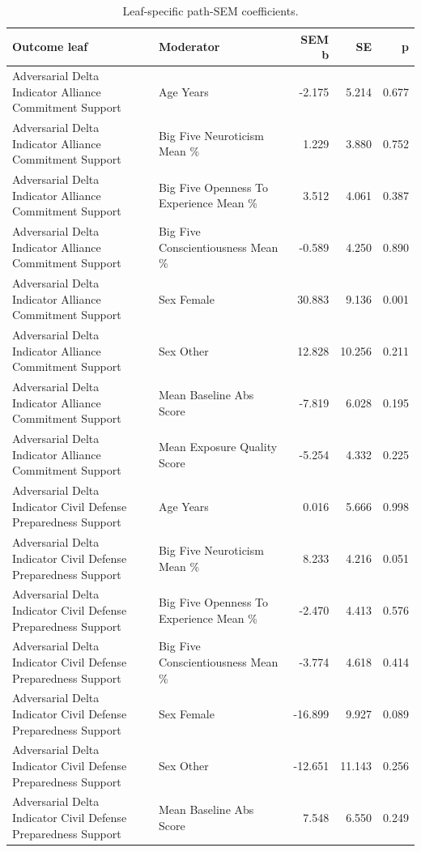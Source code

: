\begin{table}[htbp]
\raggedright
\caption{Leaf-specific path-SEM coefficients.}
\label{tab:sempaths}
{
\footnotesize
\setlength{\tabcolsep}{4pt}
\renewcommand{\arraystretch}{1.08}
\begin{tabular}{llrrr}
\toprule
Outcome leaf & Moderator & SEM b & SE & p \\
\midrule
Adversarial Delta Indicator Alliance Commitment Support & Age Years & -2.175 & 5.214 & 0.677 \\
Adversarial Delta Indicator Alliance Commitment Support & Big Five Neuroticism Mean \% & 1.229 & 3.880 & 0.752 \\
Adversarial Delta Indicator Alliance Commitment Support & Big Five Openness To Experience Mean \% & 3.512 & 4.061 & 0.387 \\
Adversarial Delta Indicator Alliance Commitment Support & Big Five Conscientiousness Mean \% & -0.589 & 4.250 & 0.890 \\
Adversarial Delta Indicator Alliance Commitment Support & Sex Female & 30.883 & 9.136 & 0.001 \\
Adversarial Delta Indicator Alliance Commitment Support & Sex Other & 12.828 & 10.256 & 0.211 \\
Adversarial Delta Indicator Alliance Commitment Support & Mean Baseline Abs Score & -7.819 & 6.028 & 0.195 \\
Adversarial Delta Indicator Alliance Commitment Support & Mean Exposure Quality Score & -5.254 & 4.332 & 0.225 \\
Adversarial Delta Indicator Civil Defense Preparedness Support & Age Years & 0.016 & 5.666 & 0.998 \\
Adversarial Delta Indicator Civil Defense Preparedness Support & Big Five Neuroticism Mean \% & 8.233 & 4.216 & 0.051 \\
Adversarial Delta Indicator Civil Defense Preparedness Support & Big Five Openness To Experience Mean \% & -2.470 & 4.413 & 0.576 \\
Adversarial Delta Indicator Civil Defense Preparedness Support & Big Five Conscientiousness Mean \% & -3.774 & 4.618 & 0.414 \\
Adversarial Delta Indicator Civil Defense Preparedness Support & Sex Female & -16.899 & 9.927 & 0.089 \\
Adversarial Delta Indicator Civil Defense Preparedness Support & Sex Other & -12.651 & 11.143 & 0.256 \\
Adversarial Delta Indicator Civil Defense Preparedness Support & Mean Baseline Abs Score & 7.548 & 6.550 & 0.249 \\

\end{tabular}}
\end{table}
